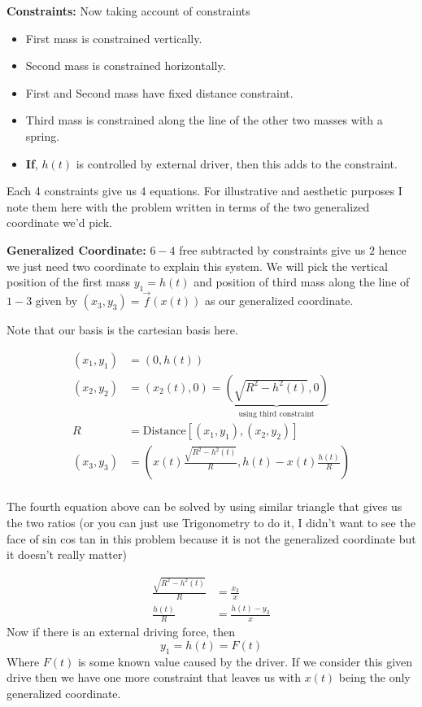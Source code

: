 \documentclass[letter, 10pts]{article}
\begin{document}
\textbf{Constraints: }Now taking account of constraints 
\begin{itemize}
	\item First mass is constrained vertically.
	\item Second mass is constrained horizontally. 
	\item First and Second mass have fixed distance constraint.
	\item Third mass is constrained along the line of the other two masses with a spring. 
	\item \textbf{If}, $h(t)$ is controlled by external driver, then this adds to the constraint.  
\end{itemize}
Each 4 constraints give us 4 equations. For illustrative and aesthetic purposes I note them here with the problem written in terms of the two generalized coordinate we'd pick.

\textbf{Generalized Coordinate:} $6 - 4$ free subtracted by constraints give us $2$ hence we just need two coordinate to explain this system. We will pick the vertical position of the first mass $y_1 = h(t)$ and position of third mass along the line of $1-3$ given by $(x_3, y_3) = \vec{f}(x(t))$ as our generalized coordinate. 

Note that our basis is the cartesian basis here. 

\begin{align*}
	(x_1, y_1) &= (0, h(t)) \\
	(x_2, y_2) &= (x_2(t), 0 ) = \underbrace{(\sqrt{R^2 - h^2(t)} , 0)}_{\text{using third constraint}} \\
R &=  	\text{Distance}[(x_1,y_1),(x_2,y_2)] \\
	(x_3, y_3) &= \left(x(t) \frac{\sqrt{R^2 - h^2(t) }  }{R} , h(t) - x(t) \frac{h(t)}{R}\right)  \\
\end{align*}

The fourth equation above can be solved by using similar triangle that gives us the two ratios (or you can just use Trigonometry to do it, I didn't want to see the face of sin cos tan in this problem because it is not the generalized coordinate but it doesn't really matter) 

\begin{align*}
	\frac{\sqrt{R^2 - h^2(t) } }{R} &= \frac{x_3}{x} \\
	\frac{h(t)}{R} &= \frac{h(t) - y_3}{x}
	\tag{For particle three constraint} 
\end{align*}
Now if there is an external driving force, then 
\[
y_1 = h(t) = F(t)	
\]
Where $F(t)$ is some known value caused by the driver.  If we consider this given drive then we have one more constraint that leaves us with $x(t)$ being the only generalized coordinate.  
\end{document}
